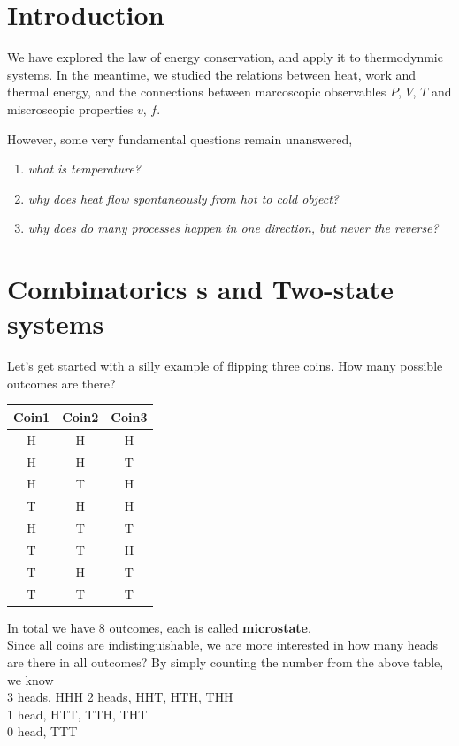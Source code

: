 

\section{Introduction}

We have explored the law of energy conservation, and apply it to thermodynmic systems.
In the meantime, we studied the relations between heat, work and thermal energy,
and the connections between marcoscopic observables $P$, $V$, $T$ and miscroscopic properties $v$, $f$.

However, some very fundamental questions remain unanswered,
\begin{enumerate}
\item{\it what is temperature?}
\item{\it why does heat flow spontaneously from hot to cold object?}
\item{\it why does do many processes happen in one direction, but never the reverse?}
\end{enumerate}

\section{Combinatorics s and Two-state systems}
Let's get started with a silly example of flipping three coins. How many possible outcomes are there?
\begin{tabular}{c c c}
Coin1 & Coin2 & Coin3 \\\hline
  H & H & H \\
  H & H & T \\
  H & T & H \\
  T & H & H \\
  H & T & T \\
  T & T & H \\
  T & H & T \\
  T & T & T \\\hline
\end{tabular}

In total we have 8 outcomes, each is called {\bf microstate}.\\
Since all coins are indistinguishable, we are more interested in how many heads are there in all outcomes?
By simply counting the number from the above table, we know \\
3 heads,  HHH 
2 heads,  HHT, HTH, THH \\
1 head,   HTT, TTH, THT \\
0 head,   TTT

